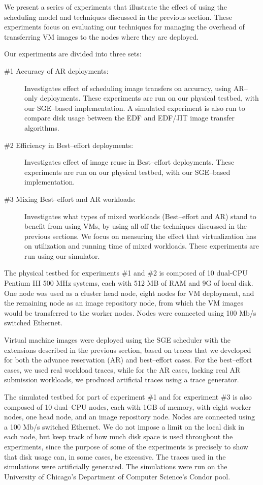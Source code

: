 We present a series of experiments that illustrate the effect of using
the scheduling model and techniques discussed in the previous section.
These experiments focus on evaluating our techniques for managing the
overhead of transferring VM images to the nodes where they are
deployed.

Our experiments are divided into three sets:

\begin{description}
\item[\#1 Accuracy of AR deployments:] Investigates effect of scheduling image transfers on accuracy, using AR--only deployments. These experiments are run on our physical testbed, with our SGE--based implementation. A simulated experiment is also run to compare disk usage between the EDF and EDF/JIT image transfer algorithms.
\item[\#2 Efficiency in Best--effort deployments:] Investigates effect of image reuse in Best--effort deployments. These experiments are run on our physical testbed, with our SGE--based implementation.
\item[\#3 Mixing Best--effort and AR workloads:] Investigates what types of mixed workloads (Best--effort and AR) stand to benefit from using VMs, by using all off the techniques discussed in the previous sections. We focus on measuring the effect that virtualization has on utilization and running time of mixed workloads. These experiments are run using our simulator.
\end{description}

The physical testbed for experiments \#1 and \#2 is composed of 10 dual{}-CPU Pentium
III 500 MHz systems, each with 512 MB of RAM and 9G of local disk. One
node was used as a cluster head node, eight nodes for VM deployment,
and the remaining node as an image repository node, from which the VM
images would be transferred to the worker nodes. Nodes were connected
using 100 Mb/s switched Ethernet.

Virtual machine images were deployed using the SGE scheduler with the
extensions described in the previous section, based on traces that we developed for both
the advance reservation (AR) and best--effort cases. For the best--effort
cases, we used real workload traces, while for the AR cases, lacking
real AR submission workloads, we produced artificial traces using a
trace generator.

The simulated testbed for part of experiment \#1 and for experiment \#3 is also composed of 10 dual{}--CPU nodes, each with 1GB of memory, with eight worker nodes, one head node, and an image repository node. Nodes are connected using a 100 Mb/s switched Ethernet. We do not impose a limit on the local disk in each node, but keep track of how much disk space is used throughout the experiments, since the purpose of some of the experiments is precisely to show that disk usage can, in some cases, be excessive. The traces used in the simulations were artificially generated. The simulations were run on the University of Chicago's Department of Computer Science's Condor pool.

